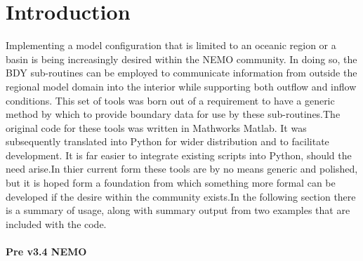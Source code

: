 

\chapter{Introduction}

Implementing a model configuration that is limited to an oceanic region or a basin
is being increasingly desired within the NEMO community. In doing so, the BDY
sub-routines can be employed to communicate information from outside the regional
model domain into the interior while supporting both outflow and inflow conditions.
This set of tools was born out of a requirement to have a generic method by which
to provide boundary data for use by these sub-routines.The original code for these
tools was written in Mathworks Matlab. It was subsequently translated into Python
for wider distribution and to facilitate development. It is far easier to integrate
existing scripts into Python, should the need arise.In thier current form these
tools are by no means generic and polished, but it is hoped form a foundation from
which something more formal can be developed if the desire within the community
exists.In the following section there is a summary of usage, along with summary
output from two examples that are included with the code.


\subsubsection{Pre v3.4 NEMO}

